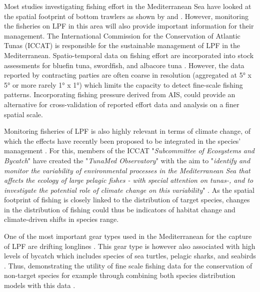 \medskip

Most studies investigating fishing effort in the Mediterranean Sea have looked at the spatial footprint of bottom trawlers as shown by \cite{ferra_trawlers_change} and \cite{marsaglia_trawling}.
However, monitoring the fisheries on LPF in this area will also provide important information for their management. The International Commission for the Conservation of Atlantic Tunas
(ICCAT) is responsible for the sustainable management of LPF in the Mediterranean. Spatio-temporal data on fishing effort are incorporated into stock assessments for bluefin tuna, swordfish, and albacore
tuna \citep{iccat_bft_summary,iccat_swo_summary,iccat_alb_summary}. However, the data reported by contracting parties are often coarse in resolution (aggregated at 5° x 5° or more rarely 1° x 1°)
which limits the capacity to detect fine-scale fishing patterns. Incorporating fishing pressure derived from AIS, could provide an alternative for cross-validation of reported effort data
and analysis on a finer spatial scale.

\medskip

Monitoring fisheries of LPF is also highly relevant in terms of climate change, of which the effects have recently been proposed to be integrated in the species' management \citep{iccat_climate_change}. 
For this, members of the ICCAT "\textit{Subcommittee of Ecosystems and Bycatch}" have created the "\textit{TunaMed Observatory}" with the aim to "\textit{identify and monitor the variability of environmental
processes in the Mediterranean Sea that affects the ecology of large pelagic fishes - with special attention on tunas-, and to investigate the potential role of climate change on this variability}" \citep{tunamed}.
As the spatial footprint of fishing is closely linked to the distribution of target species, changes in the distribution of fishing could thus be indicators of habitat change and climate-driven
shifts in species range.

\medskip

One of the most important gear types used in the Mediterranean for the capture of LPF are drifting longlines \citep{FAO2025Longlines,iccat_alb_summary,iccat_bft_summary,iccat_swo_summary}.
This gear type is however also associated with high levels of bycatch which includes species of sea turtles, pelagic sharks, and seabirds \citep{bycatch_book}. Thus, demonstrating the
utility of fine scale fishing data for the conservation of non-target species for example through combining both species distribution models with this data \citep{welch_overlap_ais_bycatch}.

